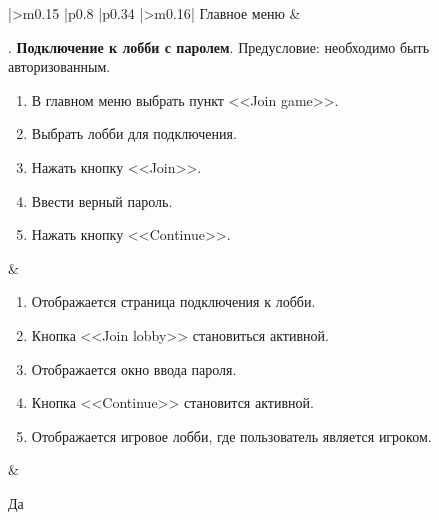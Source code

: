 \begin{landscape}
\begin{longtable}[l]{|>{\centering}m{0.15\textwidth}
					  |p{0.8\textwidth}
					  |p{0.34\textwidth}
					  |>{\centering\arraybackslash}m{0.16\textwidth}|}
	Главное меню &
	\begin{minipage}[t]{1\linewidth}
		\vspace{-1\baselineskip}
		\testnumber. \textbf{Подключение к лобби с паролем}.\newline
 		Предусловие: необходимо быть авторизованным.
 		\begin{enumerate}
			\item В главном меню выбрать пункт <<Join game>>.
 			\item Выбрать лобби для подключения.
 			\item Нажать кнопку <<Join>>.
 			\item Ввести верный пароль.
 			\item Нажать кнопку <<Continue>>.
 		\end{enumerate}
 	\end{minipage} &
	\begin{minipage}[t]{1\linewidth}
		\vspace{-1\baselineskip}
		\begin{enumerate}
			\item Отображается страница подключения к лобби.
			\item Кнопка <<Join lobby>> становиться активной.
   			\item Отображается окно ввода пароля.
      		\item Кнопка <<Continue>> становится активной.
   			\item Отображается игровое лобби, где пользователь является игроком.
		\end{enumerate}
	\end{minipage} &
	\begin{minipage}[t]{1\linewidth}
		\vspace{-1\baselineskip}
		\centering Да
	\end{minipage} \\



\end{longtable}
\end{landscape}
